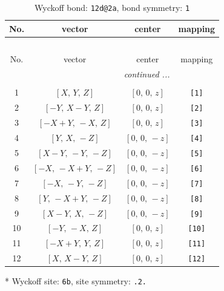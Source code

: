 \documentclass[fleqn,8pt]{jsarticle}
\begin{document}
\begin{longtable}{cccc}
\caption{Wyckoff bond: {\tt 12d@2a}, bond symmetry: {\tt 1}}
 \\
 \hline \hline
No. & vector & center & mapping \\ \hline \endfirsthead

\multicolumn{3}{l}{\tablename\ \thetable{}} \\
 \hline \hline
No. & vector & center & mapping \\ \hline \endhead

 \hline \hline
\multicolumn{3}{r}{\footnotesize\it continued ...} \\ \endfoot

 \hline \hline
\multicolumn{3}{r}{} \\ \endlastfoot

1 & $\left[ X,\, Y,\, Z \right]$ & $\left[ 0,\, 0,\, z \right]$ & {\tt [1]} \\ \hline
2 & $\left[ - Y,\, X - Y,\, Z \right]$ & $\left[ 0,\, 0,\, z \right]$ & {\tt [2]} \\ \hline
3 & $\left[ - X + Y,\, - X,\, Z \right]$ & $\left[ 0,\, 0,\, z \right]$ & {\tt [3]} \\ \hline
4 & $\left[ Y,\, X,\, - Z \right]$ & $\left[ 0,\, 0,\, - z \right]$ & {\tt [4]} \\ \hline
5 & $\left[ X - Y,\, - Y,\, - Z \right]$ & $\left[ 0,\, 0,\, - z \right]$ & {\tt [5]} \\ \hline
6 & $\left[ - X,\, - X + Y,\, - Z \right]$ & $\left[ 0,\, 0,\, - z \right]$ & {\tt [6]} \\ \hline
7 & $\left[ - X,\, - Y,\, - Z \right]$ & $\left[ 0,\, 0,\, - z \right]$ & {\tt [7]} \\ \hline
8 & $\left[ Y,\, - X + Y,\, - Z \right]$ & $\left[ 0,\, 0,\, - z \right]$ & {\tt [8]} \\ \hline
9 & $\left[ X - Y,\, X,\, - Z \right]$ & $\left[ 0,\, 0,\, - z \right]$ & {\tt [9]} \\ \hline
10 & $\left[ - Y,\, - X,\, Z \right]$ & $\left[ 0,\, 0,\, z \right]$ & {\tt [10]} \\ \hline
11 & $\left[ - X + Y,\, Y,\, Z \right]$ & $\left[ 0,\, 0,\, z \right]$ & {\tt [11]} \\ \hline
12 & $\left[ X,\, X - Y,\, Z \right]$ & $\left[ 0,\, 0,\, z \right]$ & {\tt [12]} \\
\end{longtable}
* Wyckoff site: {\tt 6b}, site symmetry: {\tt .2.}
\renewcommand{\arraystretch}{1.2}
\end{document}
